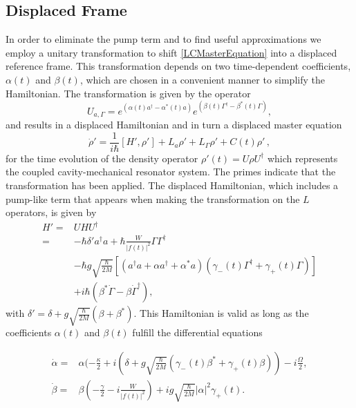 \documentclass[reprint, amsmath,amssymb, aps,pra]{revtex4-1}
\begin{document}
\subsection{Displaced Frame}

In order to eliminate the pump term and to find useful approximations
we employ a unitary transformation to shift \eqref{LCMasterEquation}
into a displaced reference frame. This transformation depends on two
time-dependent coefficients, $\alpha(t)$ and $\beta(t)$, which are
chosen in a convenient manner to simplify the Hamiltonian. The
transformation is given by the operator
\begin{equation}\label{ShiftTransform}
U_{a,\Gamma} = e^{(\alpha(t) a^\dagger - \alpha^*(t)a)}e^{(\beta(t) \Gamma^\dagger - \beta^*(t)\Gamma)},
\end{equation}
and results in a displaced Hamiltonian and in turn a displaced master
equation
\begin{equation}\label{eq:master_no_small}
\dot{\rho}' = \frac{1}{i\hbar}[H',\rho'] +L_a\rho' + L_\Gamma \rho' + C(t)\rho'\, ,
\end{equation}
for the time evolution of the density operator
$\rho'(t)=U\rho U^\dagger$ which represents the coupled
cavity-mechanical resonator system. The primes indicate that the
transformation has been applied. The displaced Hamiltonian, which
includes a pump-like term that appears when making the transformation
on the $L$ operators, is given by
\begin{align}\label{eq:hamiltonian_no_small}
  H'=&U H U^\dagger\nonumber\\=& -\hbar \delta' a^\dagger a + \hbar\frac{W}{|f(t)|^2}\Gamma \Gamma^\dagger\nonumber\\
     &-\hbar g\sqrt{\frac{\hbar}{2M}}[(a^{\dagger}a +\alpha a^{\dagger}+\alpha^* a)(\gamma_-(t)\Gamma^{\dagger}+\gamma_+(t)\Gamma)]\nonumber\\
     &+ i\hbar(\beta^*\dot{\Gamma} - \beta \dot{\Gamma}^\dagger),
\end{align}
with $\delta' = \delta + g\sqrt{\frac{\hbar}{2M}}(\beta + \beta^*)$.
This Hamiltonian is valid as long as the coefficients $\alpha(t)$ and
$\beta(t)$ fulfill the differential equations

\begin{align}\label{eq:displaced_frame}
\dot{\alpha} =& \alpha(-\frac{\kappa}{2}+i(\delta+g\sqrt{\frac{\hbar}{2M}}(\gamma_-(t) \beta^* + \gamma_+(t) \beta))-i\frac{\Omega}{2},\\
\dot{\beta} =& \beta(-\frac{\gamma}{2}-i\frac{W}{|f(t)|^2})+ig\sqrt{\frac{\hbar}{2M}}|\alpha|^2\gamma_+(t).
\end{align}
\end{document}
